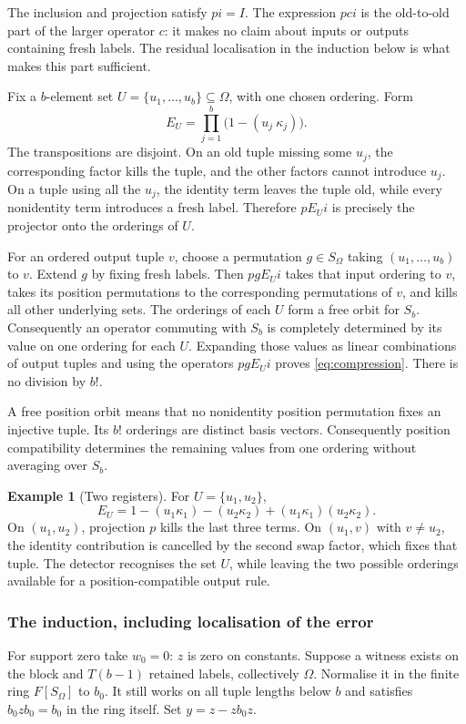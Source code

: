 \documentclass[11pt,a4paper]{article}
\theoremstyle{definition}\newtheorem{definition}[theorem]{Definition}
\newtheorem{example}[theorem]{Example}
\theoremstyle{remark}\newtheorem{remark}[theorem]{Remark}
\begin{document}
The inclusion and projection satisfy $pi=I$. The expression $pci$
is the old-to-old part of the larger operator $c$: it makes no claim
about inputs or outputs containing fresh labels. The residual
localisation in the induction below is what makes this part sufficient.

Fix a $b$-element set $U=\{u_1,\ldots,u_b\}\subseteq\Omega$, with one chosen ordering. Form
\[E_U=\prod_{j=1}^b\bigl(1-(u_j\ \kappa_j)\bigr).\]
The transpositions are disjoint. On an old tuple missing some $u_j$, the corresponding factor kills the tuple, and the other factors cannot introduce $u_j$. On a tuple using all the $u_j$, the identity term leaves the tuple old, while every nonidentity term introduces a fresh label. Therefore $pE_Ui$ is precisely the projector onto the orderings of $U$.

For an ordered output tuple $v$, choose a permutation $g\in S_\Omega$ taking $(u_1,\ldots,u_b)$ to $v$. Extend $g$ by fixing fresh labels. Then $pgE_Ui$ takes that input ordering to $v$, takes its position permutations to the corresponding permutations of $v$, and kills all other underlying sets. The orderings of each $U$ form a free orbit for $S_b$. Consequently an operator commuting with $S_b$ is completely determined by its value on one ordering for each $U$. Expanding those values as linear combinations of output tuples and using the operators $pgE_Ui$ proves \eqref{eq:compression}. There is no division by $b!$.

A free position orbit means that no nonidentity position permutation
fixes an injective tuple. Its $b!$ orderings are distinct basis vectors.
Consequently position compatibility determines the remaining values
from one ordering without averaging over $S_b$.

\begin{example}[Two registers]
For $U=\{u_1,u_2\}$,
\[E_U=1-(u_1\kappa_1)-(u_2\kappa_2)+(u_1\kappa_1)(u_2\kappa_2).
\]
On $(u_1,u_2)$, projection $p$ kills the last three terms. On $(u_1,v)$ with $v\ne u_2$, the identity contribution is cancelled by the second swap factor, which fixes that tuple. The detector recognises the set $U$, while leaving the two possible orderings available for a position-compatible output rule.
\end{example}

\subsubsection{The induction, including localisation of the error}
For support zero take $w_0=0$: $z$ is zero on constants. Suppose a witness exists on the block and $T(b-1)$ retained labels, collectively $\Omega$. Normalise it in the finite ring $F[S_\Omega]$ to $b_0$. It still works on all tuple lengths below $b$ and satisfies $b_0zb_0=b_0$ in the ring itself. Set $y=z-zb_0z$.
\end{document}
